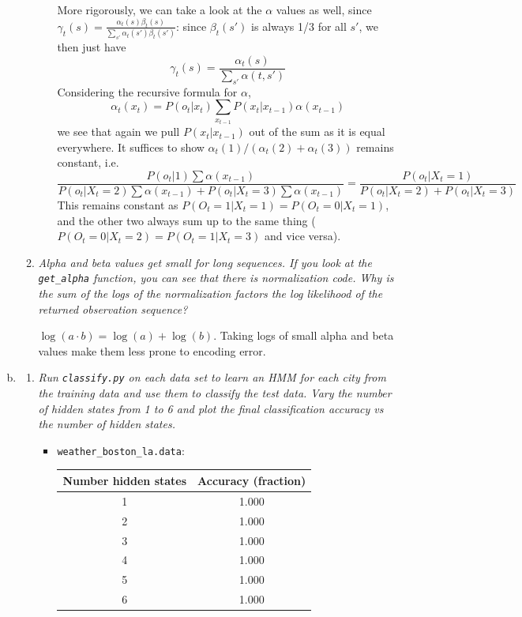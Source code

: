 \documentclass{article}
\begin{document}
\begin{enumerate}[(a)]
\begin{enumerate}
\begin{enumerate}[(1)]
      More rigorously, we can take a look at the $\alpha$ values as well,
      since $\gamma_t(s)=\frac{\alpha_t(s)\beta_t(s)}{\sum_{s'}\alpha_t(s')\beta_t(s')}$:
      since $\beta_t(s')$ is always 1/3 for all $s'$, we then just have
      \[\gamma_t(s)=\frac{\alpha_t(s)}{\sum_{s'}\alpha(t,s')}\]
      Considering the recursive formula for $\alpha$,
      \[\alpha_t(x_t)=P(o_t|x_t)\sum_{x_{t-1}}P(x_t|x_{t-1})\alpha(x_{t-1})\]
      we see that again we pull $P(x_t|x_{t-1})$ out of the sum as it is
      equal everywhere. It suffices to show
      $\alpha_t(1)/(\alpha_t(2)+\alpha_t(3))$ remains constant, i.e.
      \[\frac{P(o_t|1)\sum \alpha(x_{t-1})}{P(o_t|X_t=2)\sum\alpha(x_{t-1})+P(o_t|X_t=3)\sum \alpha(x_{t-1})}=\frac{P(o_t|X_t=1)}{P(o_t|X_t=2)+P(o_t|X_t=3)}\]
      This remains constant as $P(O_t=1|X_t=1)=P(O_t=0|X_t=1)$, and the other two
      always sum up to the same thing ($P(O_t=0|X_t=2)=P(O_t=1|X_t=3)$ and vice versa).

    \end{enumerate}

  \item \emph{Alpha and beta values get small for long sequences. If you look at the
    \emph{\texttt{get\_alpha}} function, you can see that there is normalization code.
    Why is the sum of the logs of the normalization factors the log likelihood of
    the returned observation sequence?}

    $\log(a\cdot b)=\log(a)+\log(b)$. Taking logs of small alpha and beta values
    make them less prone to encoding error.

  \end{enumerate}

\item
  \begin{enumerate}
  \item \emph{Run \texttt{\emph{classify.py}} on each data set to learn an HMM
    for each city from the training data and use them to classify the test data.
    Vary the number of hidden states from 1 to 6 and plot the final classification
    accuracy vs the number of hidden states.}

    \begin{itemize}
    \item \texttt{weather\_boston\_la.data}:\\

      \begin{tabular}{|cc|}
        \hline
        Number hidden states & Accuracy (fraction)\\
        \hline
        1 & 1.000\\
        2 & 1.000\\
        3 & 1.000\\
        4 & 1.000\\
        5 & 1.000\\
        6 & 1.000\\
        \hline
      \end{tabular}


\end{itemize}
\end{enumerate}
\end{enumerate}
\end{document}
